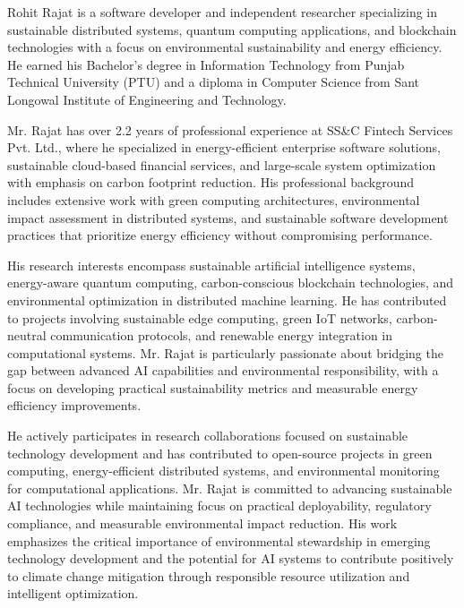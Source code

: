 \documentclass[10pt,journal,compsoc]{IEEEtran}
\begin{document}
\begin{IEEEbiography}{Rohit Rajat}
is a software developer and independent researcher specializing in sustainable distributed systems, quantum computing applications, and blockchain technologies with a focus on environmental sustainability and energy efficiency. He earned his Bachelor's degree in Information Technology from Punjab Technical University (PTU) and a diploma in Computer Science from Sant Longowal Institute of Engineering and Technology.

Mr. Rajat has over 2.2 years of professional experience at SS\&C Fintech Services Pvt. Ltd., where he specialized in energy-efficient enterprise software solutions, sustainable cloud-based financial services, and large-scale system optimization with emphasis on carbon footprint reduction. His professional background includes extensive work with green computing architectures, environmental impact assessment in distributed systems, and sustainable software development practices that prioritize energy efficiency without compromising performance.

His research interests encompass sustainable artificial intelligence systems, energy-aware quantum computing, carbon-conscious blockchain technologies, and environmental optimization in distributed machine learning. He has contributed to projects involving sustainable edge computing, green IoT networks, carbon-neutral communication protocols, and renewable energy integration in computational systems. Mr. Rajat is particularly passionate about bridging the gap between advanced AI capabilities and environmental responsibility, with a focus on developing practical sustainability metrics and measurable energy efficiency improvements.

He actively participates in research collaborations focused on sustainable technology development and has contributed to open-source projects in green computing, energy-efficient distributed systems, and environmental monitoring for computational applications. Mr. Rajat is committed to advancing sustainable AI technologies while maintaining focus on practical deployability, regulatory compliance, and measurable environmental impact reduction. His work emphasizes the critical importance of environmental stewardship in emerging technology development and the potential for AI systems to contribute positively to climate change mitigation through responsible resource utilization and intelligent optimization.
\end{IEEEbiography}
\end{document}
